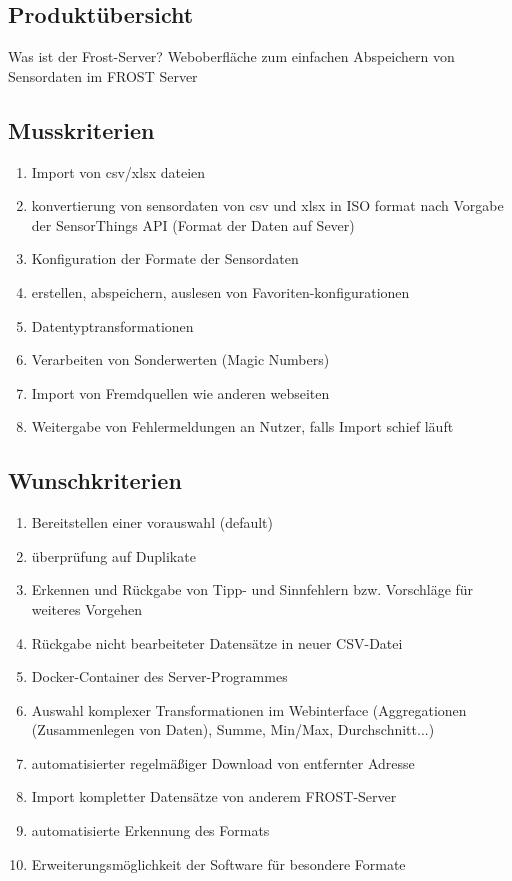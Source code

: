 \documentclass[12 pt]{article}
\begin{document}
\subsection{Produktübersicht}
Was ist der Frost-Server?
Weboberfläche zum einfachen Abspeichern von Sensordaten im FROST Server

\subsection{Musskriterien}
\begin{enumerate}
\item Import von csv/xlsx dateien
\item konvertierung von sensordaten von csv und xlsx in ISO format nach Vorgabe der SensorThings API (Format der Daten auf Sever)
\item Konfiguration der Formate der Sensordaten
\item erstellen, abspeichern, auslesen von Favoriten-konfigurationen
\item Datentyptransformationen
\item Verarbeiten von Sonderwerten (Magic Numbers)
\item Import von Fremdquellen wie anderen webseiten
\item Weitergabe von Fehlermeldungen an Nutzer, falls Import schief läuft
\end{enumerate}

\subsection{Wunschkriterien}
\begin{enumerate}
\item Bereitstellen einer vorauswahl (default)
\item überprüfung auf Duplikate
\item Erkennen und Rückgabe von Tipp- und Sinnfehlern bzw. Vorschläge für weiteres Vorgehen
\item Rückgabe nicht bearbeiteter Datensätze in neuer CSV-Datei
\item Docker-Container des Server-Programmes
\item Auswahl komplexer Transformationen im Webinterface (Aggregationen (Zusammenlegen von Daten), Summe, Min/Max, Durchschnitt...)
\item automatisierter regelmäßiger Download von entfernter Adresse
\item Import kompletter Datensätze von anderem FROST-Server
\item automatisierte Erkennung des Formats
\item Erweiterungsmöglichkeit der Software für besondere Formate

\end{enumerate}
\end{document}
